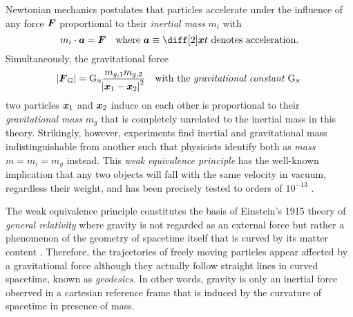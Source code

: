 \documentclass[12pt,parskip=half]{scrreprt}
\begin{document}
Newtonian mechanics postulates that particles accelerate under the influence of any force \(\boldsymbol{F}\) proportional to their \emph{inertial mass} \(m_i\) with
\begin{equation}
	m_i \cdot \vect{a} = \vect{F} \quad \text{where \(\vect{a} \equiv \ddt{\vect{x}}\) denotes acceleration.}
\end{equation}
Simultaneously, the gravitational force
\begin{equation}
	\abs{\boldsymbol{F}_\textnormal{G}} = \mathrm{G}_\textnormal{\tiny{N}} \frac{m_{g,1}m_{g,2}}{\abs{\boldsymbol{x}_1-\boldsymbol{x}_2}^2} \quad \text{with the \emph{gravitational constant \(\mathrm{G}_\textnormal{\tiny{N}}\)}}
\end{equation}
two particles \(\boldsymbol{x}_1\) and \(\boldsymbol{x}_2\) induce on each other is proportional to their \emph{gravitational mass} \(m_g\) that is completely unrelated to the inertial mass in this theory. Strikingly, however, experiments find inertial and gravitational mass indistinguishable from another such that physicists identify both as \emph{mass} \(m=m_i=m_g\) instead. This \emph{weak equivalence principle} has the well-known implication that any two objects will fall with the same velocity in vacuum, regardless their weight, and has been precisely tested to orders of \(10^{-13}\) \autocite{Adelberger2001,Wagner2012}.

The weak equivalence principle constitutes the basis of Einstein's 1915 theory of \emph{general relativity} where gravity is not regarded as an external force but rather a phenomenon of the geometry of spacetime itself that is curved by its matter content \autocite{Einstein1915}. Therefore, the trajectories of freely moving particles appear affected by a gravitational force although they actually follow straight lines in curved spacetime, known as \emph{geodesics}. In other words, gravity is only an inertial force observed in a cartesian reference frame that is induced by the curvature of spacetime in presence of mass.
\end{document}
